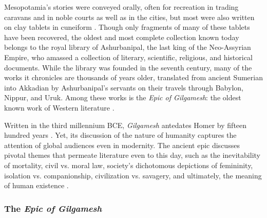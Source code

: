 \documentclass[10pt,a4paper]{article}
\begin{document}
Mesopotamia’s stories were conveyed orally, often for recreation in trading caravans and in noble courts as well as in the cities, but most were also written on clay tablets in cuneiform \cite{dalley2000myths}. Though only fragments of many of these tablets have been recovered, the oldest and most complete collection known today belongs to the royal library of Ashurbanipal, the last king of the Neo-Assyrian Empire, who amassed a collection of literary, scientific, religious, and historical documents. While the library was founded in the seventh century, many of the works it chronicles are thousands of years older, translated from ancient Sumerian into Akkadian by Ashurbanipal’s servants on their travels through Babylon, Nippur, and Uruk. Among these works is the \emph{Epic of Gilgamesh}: the oldest known work of Western literature \cite{sandars1972epic}.

Written in the third millennium BCE, \emph{Gilgamesh} antedates Homer by fifteen hundred years \cite{sandars1972epic}. Yet, its discussion of the nature of humanity captures the attention of global audiences even in modernity. The ancient epic discusses pivotal themes that permeate literature even to this day, such as the inevitability of mortality, civil vs. moral law, society’s dichotomous depictions of femininity, isolation vs. companionship, civilization vs. savagery, and ultimately, the meaning of human existence \cite{snigowski2015}.

%
%
\subsubsection{The \emph{Epic of Gilgamesh}}
\end{document}
